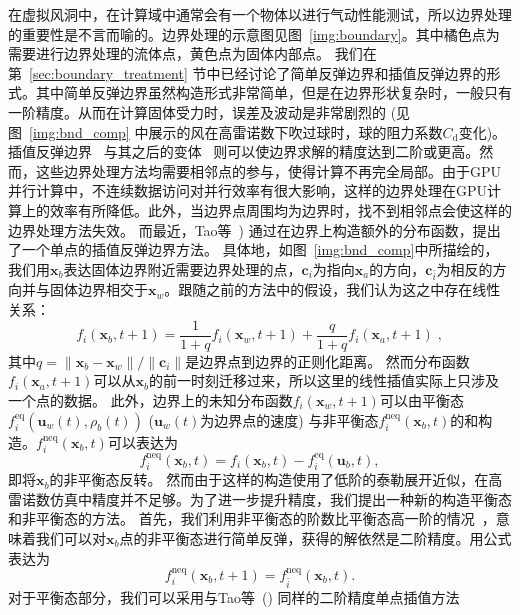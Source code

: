 在虚拟风洞中，在计算域中通常会有一个物体以进行气动性能测试，所以边界处理的重要性是不言而喻的。边界处理的示意图见图~\ref{img:boundary}。其中橘色点为需要进行边界处理的流体点，黄色点为固体内部点。
我们在第~\ref{sec:boundary_treatment} 节中已经讨论了简单反弹边界和插值反弹边界的形式。其中简单反弹边界虽然构造形式非常简单，但是在边界形状复杂时，一般只有一阶精度。从而在计算固体受力时，误差及波动是非常剧烈的 (见图~\ref{img:bnd_comp} 中展示的风在高雷诺数下吹过球时，球的阻力系数$C_\text{d}$变化)。
插值反弹边界~\cite{Bouzidi-2001} 与其之后的变体~\cite{Yu-2003, Ginzburg-2003, Chun-2007} 则可以使边界求解的精度达到二阶或更高。然而，这些边界处理方法均需要相邻点的参与，使得计算不再完全局部。由于GPU并行计算中，不连续数据访问对并行效率有很大影响，这样的边界处理在GPU计算上的效率有所降低。此外，当边界点周围均为边界时，找不到相邻点会使这样的边界处理方法失效。
而最近，Tao等~\citeyear{Tao-2018-b}) 通过在边界上构造额外的分布函数，提出了一个单点的插值反弹边界方法。
具体地，如图~\ref{img:bnd_comp}中所描绘的，我们用$\bm{x}_{b}$表达固体边界附近需要边界处理的点，$\bm{c}_{i}$为指向$\bm{x}_{a}$的方向，$\bm{c}_{\bar{i}}$为相反的方向并与固体边界相交于$\bm{x}_{w}$。跟随之前的方法中的假设，我们认为这之中存在线性关系：
\begin{equation}
f_i(\bm{x}_b, t\!+\!1) = \frac{1}{1+q}f_{i}(\bm{x}_w, t\!+\!1)+ \frac{q}{1+q}f_{i}(\bm{x}_a, t\!+\!1) \;,
\end{equation}
其中$q=\|\bm{x}_b - \bm{x}_w\|/\|\bm{c}_i\|$是边界点到边界的正则化距离。
然而分布函数$f_{i}(\bm{x}_a, t+1)$可以从$\bm{x}_b$的前一时刻迁移过来，所以这里的线性插值实际上只涉及一个点的数据。
此外，边界上的未知分布函数$f_{i}(\bm{x}_w, t\!+\!1)$可以由平衡态$f_{i}^\text{eq}(\bm{u}_w(t), \rho_b(t))$ ($\bm{u}_w(t)$为边界点的速度) 与非平衡态$f_{i}^\text{neq}(\bm{x}_b, t)$的和构造。$f_{i}^\text{neq}(\bm{x}_b, t)$可以表达为
\begin{equation}
f_{i}^\text{neq}(\bm{x}_b, t) = f_{i}(\bm{x}_b, t) - f_{i}^\text{eq}(\bm{u}_b, t),
\end{equation}
即将$\bm{x}_b$的非平衡态反转。
然而由于这样的构造使用了低阶的泰勒展开近似，在高雷诺数仿真中精度并不足够。为了进一步提升精度，我们提出一种新的构造平衡态和非平衡态的方法。
首先，我们利用非平衡态的阶数比平衡态高一阶的情况~\cite{Chun-2007}，意味着我们可以对$\bm{x}_b$点的非平衡态进行简单反弹，获得的解依然是二阶精度。用公式表达为
\begin{equation}
\label{eq:neq_bb}
f^\text{neq}_{i}(\bm{x}_b, t\!+\!1) = f^\text{neq}_{\bar{i}}(\bm{x}_b, t).
\end{equation}
对于平衡态部分，我们可以采用与Tao等~(\citeyear{Tao-2018-b}) 同样的二阶精度单点插值方法
